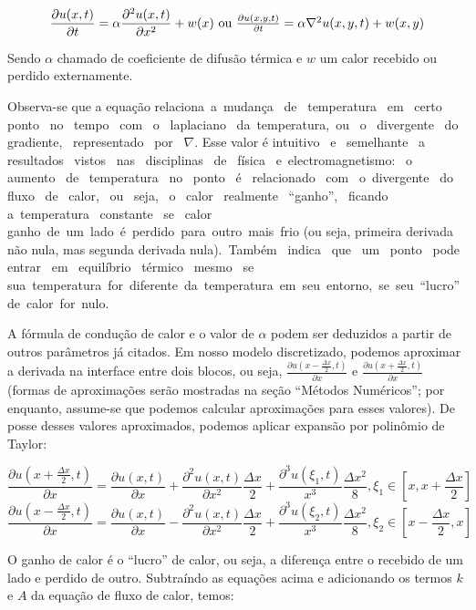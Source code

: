 \documentclass[12pt,fleqn]{article}
\begin{document}
\[\frac{\partial u(x, t)}{\partial t} = \alpha \frac{\partial^2 u(x, t)}{\partial x^2} + w(x) $ ou $ \frac{\partial u(x, y, t)}{\partial t} = \alpha \nabla^2 u(x, y, t) + w(x, y)\]

Sendo $\alpha$ chamado de coeficiente de difusão térmica e $w$ um calor recebido ou perdido externamente.

Observa-se que a equação relaciona a mudança  de  temperatura  em  certo  ponto  no  tempo  com  o  laplaciano  da temperatura, ou  o  divergente  do  gradiente,  representado  por  $\nabla$. Esse valor é intuitivo  e  semelhante  a  resultados  vistos  nas  disciplinas  de  física  e electromagnetismo:  o  aumento  de  temperatura  no  ponto  é  relacionado  com  o divergente  do  fluxo  de  calor,  ou  seja,  o  calor  realmente  “ganho”,  ficando  a temperatura  constante  se  calor  ganho de um lado é perdido para outro mais frio (ou seja, primeira derivada não nula, mas segunda derivada nula). Também  indica  que  um  ponto  pode  entrar  em  equilíbrio  térmico  mesmo  se  sua temperatura for diferente da temperatura em seu entorno, se seu “lucro” de calor for nulo.

A fórmula de condução de calor e o valor de $\alpha$ podem ser deduzidos a partir de outros parâmetros já citados. Em nosso modelo discretizado, podemos aproximar a derivada na interface entre dois blocos, ou seja, $\frac{\partial u(x - \frac{\Delta x}{2}, t)}{\partial x}$ e $\frac{\partial u(x + \frac{\Delta x}{2}, t)}{\partial x}$ (formas de aproximações serão mostradas na seção ``Métodos Numéricos''; por enquanto, assume-se que podemos calcular aproximações para esses valores). De posse desses valores aproximados, podemos aplicar expansão por polinômio de Taylor:

\[
\frac{\partial u(x + \frac{\Delta x}{2}, t)}{\partial x} = \frac{\partial u(x, t)}{\partial x} + \frac{\partial^2 u(x, t)}{\partial x^2} \frac{\Delta x}{2} + \frac{\partial^3 u(\xi_1, t)}{x^3} \frac{\Delta x^2}{8}, \xi_1 \in [x, x + \frac{\Delta x}{2}]
\]
\[
\frac{\partial u(x - \frac{\Delta x}{2}, t)}{\partial x} = \frac{\partial u(x, t)}{\partial x} - \frac{\partial^2 u(x, t)}{\partial x^2} \frac{\Delta x}{2} + \frac{\partial^3 u(\xi_2, t)}{x^3} \frac{\Delta x^2}{8}, \xi_2 \in [x - \frac{\Delta x}{2}, x]
\]

O ganho de calor é o ``lucro'' de calor, ou seja, a diferença entre o recebido de um lado e perdido de outro. Subtraíndo as equações acima e adicionando os termos $k$ e $A$ da equação de fluxo de calor, temos:
\end{document}
